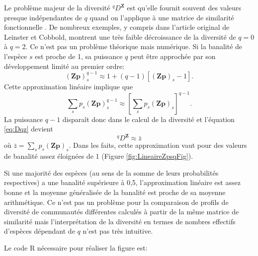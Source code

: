 \documentclass[
  11pt,
  french,
  a4paper,
  extrafontsizes,onecolumn,openright
  ]{memoir}
\begin{document}
\normalsize

Le problème majeur de la diversité \(^q\!D^{\mathbf{Z}}\) est qu'elle fournit souvent des valeurs presque indépendantes de \(q\) quand on l'applique à une matrice de similarité fonctionnelle \autocite{Chiu2014b}.
De nombreux exemples, y compris dans l'article original de Leinster et Cobbold, montrent une très faible décroissance de la diversité de \(q=0\) à \(q=2\).
Ce n'est pas un problème théorique mais numérique.
Si la banalité de l'espèce \(s\) est proche de 1, sa puissance \(q\) peut être approchée par son développement limité au premier ordre:
\[{(\mathbf{Zp})}_{s}^{q-1} \approx 1 + (q-1)[{(\mathbf{Zp})}_{s} - 1].\]
Cette approximation linéaire implique que
\[\sum_s{p_s{\left(\mathbf{Zp}\right)}^{q-1}_s} \approx [\sum_s{p_s{\left(\mathbf{Zp}\right)}_s}]^{q-1}.\]
La puissance \(q-1\) disparaît donc dans le calcul de la diversité et l'équation \eqref{eq:Dqz} devient
\[^q\!D^{\mathbf{Z}} \approx \bar{z}\]
où \(\bar{z} = \sum_s{p_s (\mathbf{Zp})_s}\).
Dans les faits, cette approximation vaut pour des valeurs de banalité assez éloignées de 1 (Figure \ref{fig:LineaireZpsqFig}).

Si une majorité des espèces (au sens de la somme de leurs probabilités respectives) a une banalité supérieure à 0,5, l'approximation linéaire est assez bonne et la moyenne généralisée de la banalité est proche de sa moyenne arithmétique.
Ce n'est pas un problème pour la comparaison de profils de diversité de communautés différentes calculés à partir de la même matrice de similarité mais l'interprétation de la diversité en termes de nombres effectifs d'espèces dépendant de \(q\) n'est pas très intuitive.

Le code R nécessaire pour réaliser la figure est:

\scriptsize
\end{document}
